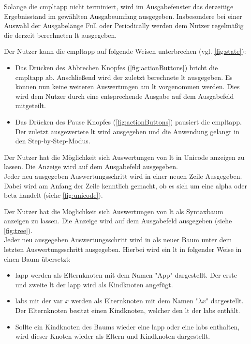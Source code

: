 \documentclass[parskip=full,11pt,twoside]{scrartcl}
\begin{document}
Solange die \gls{cmpltapp} nicht terminiert, wird im Ausgabefenster das derzeitige Ergebnisstand im gewählten Ausgabeumfang ausgegeben. 
Insbesondere bei einer Auswahl der Ausgabelänge Full oder Periodically werden dem Nutzer regelmäßig die derzeit berechneten \gls{lt} ausgegeben.

Der Nutzer kann die \gls{cmpltapp} auf folgende Weisen unterbrechen (vgl. \cref{fig:state}):
\begin{itemize}
	\item Das Drücken des Abbrechen Knopfes (\cref{fig:actionButtons}) bricht die \gls{cmpltapp} ab. 
	Anschließend wird der zuletzt berechnete \gls{lt} ausgegeben. Es können nun keine weiteren Auswertungen am \gls{lt} vorgenommen werden. 
	Dies wird dem Nutzer durch eine entsprechende Ausgabe auf dem Ausgabefeld mitgeteilt.
	\item Das Drücken des Pause Knopfes (\cref{fig:actionButtons}) pausiert die \gls{cmpltapp}. 
	Der zuletzt ausgewertete \gls{lt} wird ausgegeben und die Anwendung gelangt in den Step-by-Step-Modus.
\end{itemize}

Der Nutzer hat die Möglichkeit sich Auswertungen von \gls{lt} in Unicode anzeigen zu lassen. Die Anzeige wird auf dem Ausgabefeld ausgegeben.\\
Jeder neu ausgegeben Auswertungsschritt wird in einer neuen Zeile Ausgegeben. 
Dabei wird am Anfang der Zeile kenntlich gemacht, ob es sich um eine \gls{alpha} oder \gls{beta} handelt (siehe \cref{fig:unicode}).

Der Nutzer hat die Möglichkeit sich Auswertungen von \gls{lt} als Syntaxbaum anzeigen zu lassen. Die Anzeige wird auf dem Ausgabefeld ausgegeben (siehe \cref{fig:tree}).\\
Jeder neu ausgegeben Auswertungsschritt wird in als neuer Baum unter dem letzten Auswertungsschritt ausgegeben. Hierbei wird ein \gls{lt} in folgender Weise in einen Baum übersetzt:
\begin{itemize}
	\item \gls{lapp} werden als Elternknoten mit dem Namen "App" dargestellt. 
	Der erste und zweite \gls{lt} der \gls{lapp} wird als Kindknoten angefügt.
	\item \gls{labs} mit der \gls{var} $x$ werden als Elternknoten mit dem Namen "$\lambda x$" dargestellt. 
	Der Elternknoten besitzt einen Kindknoten, welcher den \gls{lt} der \gls{labs} enthält.
	\item Sollte ein Kindknoten des Baums wieder eine \gls{lapp} oder eine \gls{labs} enthalten, wird dieser Knoten wieder als Eltern und Kindknoten dargestellt.
	\end{itemize}
\end{document}
